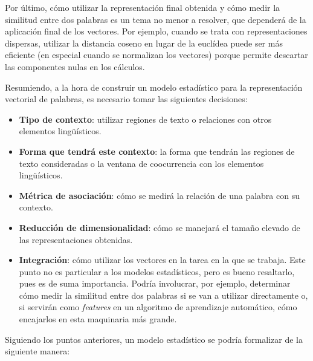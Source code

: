 Por último, cómo utilizar la representación final obtenida y cómo medir la similitud entre dos
palabras es un tema no menor a resolver, que dependerá de la aplicación final de los vectores. Por
ejemplo, cuando se trata con representaciones dispersas, utilizar la distancia coseno en lugar de la
euclídea puede ser más eficiente (en especial cuando se normalizan los vectores) porque permite
descartar las componentes nulas en los cálculos.

Resumiendo, a la hora de construir un modelo estadístico para la representación vectorial de
palabras, es necesario tomar las siguientes decisiones:

\begin{itemize}

\item \textbf{Tipo de contexto}: utilizar regiones de texto o relaciones con otros elementos
lingüísticos.

\item \textbf{Forma que tendrá este contexto}: la forma que tendrán las regiones de texto
consideradas o la ventana de coocurrencia con los elementos lingüísticos.

\item \textbf{Métrica de asociación}: cómo se medirá la relación de una palabra con su contexto.

\item \textbf{Reducción de dimensionalidad}: cómo se manejará el tamaño elevado de las
representaciones obtenidas.

\item \textbf{Integración}: cómo utilizar los vectores en la tarea en la que se trabaja. Este punto
no es particular a los modelos estadísticos, pero es bueno resaltarlo, pues es de suma
importancia. Podría involucrar, por ejemplo, determinar cómo medir la similitud entre dos palabras
si se van a utilizar directamente o, si servirán como \textit{features} en un algoritmo de
aprendizaje automático, cómo encajarlos en esta maquinaria más grande.

\end{itemize}

Siguiendo los puntos anteriores, un modelo estadístico se podría formalizar de la siguiente manera:

